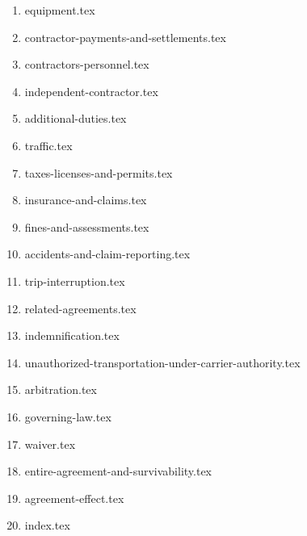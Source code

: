 \begin{enumerate}
    \item {equipment.tex}
    \item {contractor-payments-and-settlements.tex}
    \item {contractors-personnel.tex}
    \item {independent-contractor.tex}
    \item {additional-duties.tex}
    \item {traffic.tex}
    \item {taxes-licenses-and-permits.tex}
    \item {insurance-and-claims.tex}
    \item {fines-and-assessments.tex}
    \item {accidents-and-claim-reporting.tex}
    \item {trip-interruption.tex}
    \item {related-agreements.tex}
    \item {indemnification.tex}
    \item {unauthorized-transportation-under-carrier-authority.tex}
    \item {arbitration.tex}
    \item {governing-law.tex}
    \item {waiver.tex}
    \item {entire-agreement-and-survivability.tex}
    \item {agreement-effect.tex}
    \item {index.tex}
\end{enumerate}
